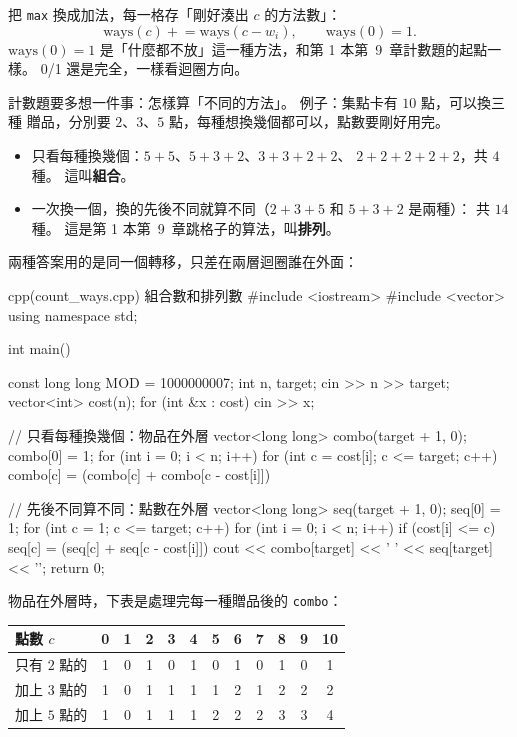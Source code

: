 把 \texttt{max} 換成加法，每一格存「剛好湊出 $c$ 的方法數」：
\[
\mathrm{ways}(c) \mathrel{+}= \mathrm{ways}(c - w_i),\qquad \mathrm{ways}(0) = 1.
\]
$\mathrm{ways}(0) = 1$ 是「什麼都不放」這一種方法，和第 1 本第~9~章計數題的起點一樣。
0/1 還是完全，一樣看迴圈方向。

計數題要多想一件事：怎樣算「不同的方法」。 例子：集點卡有 $10$ 點，可以換三種
贈品，分別要 $2$、$3$、$5$ 點，每種想換幾個都可以，點數要剛好用完。

\begin{itemize}
\item 只看每種換幾個：$5 + 5$、$5 + 3 + 2$、$3 + 3 + 2 + 2$、
$2 + 2 + 2 + 2 + 2$，共 $4$ 種。 這叫\textbf{組合}。
\item 一次換一個，換的先後不同就算不同（$2 + 3 + 5$ 和 $5 + 3 + 2$ 是兩種）：
共 $14$ 種。 這是第 1 本第~9~章跳格子的算法，叫\textbf{排列}。
\end{itemize}

兩種答案用的是同一個轉移，只差在兩層迴圈誰在外面：

\begin{example}[label=ex:count-ways]{cpp}{(count\_ways.cpp) 組合數和排列數}
#include <iostream>
#include <vector>
using namespace std;

int main() {
    const long long MOD = 1000000007;
    int n, target;
    cin >> n >> target;
    vector<int> cost(n);
    for (int &x : cost) {
        cin >> x;
    }

    // 只看每種換幾個：物品在外層
    vector<long long> combo(target + 1, 0);
    combo[0] = 1;
    for (int i = 0; i < n; i++) {
        for (int c = cost[i]; c <= target; c++) {
            combo[c] = (combo[c] + combo[c - cost[i]]) %
        }
    }

    // 先後不同算不同：點數在外層
    vector<long long> seq(target + 1, 0);
    seq[0] = 1;
    for (int c = 1; c <= target; c++) {
        for (int i = 0; i < n; i++) {
            if (cost[i] <= c) {
                seq[c] = (seq[c] + seq[c - cost[i]]) %
            }
        }
    }
    cout << combo[target] << ' ' << seq[target] << '\n';
    return 0;
}
\end{example}


物品在外層時，下表是處理完每一種贈品後的 \texttt{combo}：

\begin{center}
\begin{tabular}{l|ccccccccccc}
\toprule
點數 $c$ & 0 & 1 & 2 & 3 & 4 & 5 & 6 & 7 & 8 & 9 & 10 \\
\midrule
只有 $2$ 點的 & 1 & 0 & 1 & 0 & 1 & 0 & 1 & 0 & 1 & 0 & 1 \\
加上 $3$ 點的 & 1 & 0 & 1 & 1 & 1 & 1 & 2 & 1 & 2 & 2 & 2 \\
加上 $5$ 點的 & 1 & 0 & 1 & 1 & 1 & 2 & 2 & 2 & 3 & 3 & 4 \\
\bottomrule
\end{tabular}
\end{center}

